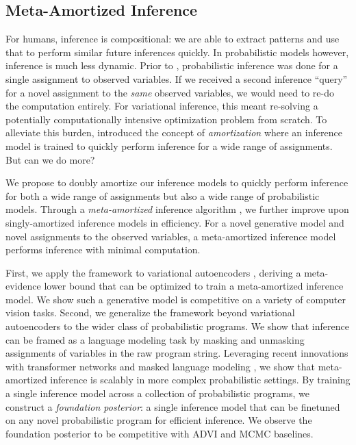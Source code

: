 \subsection{Meta-Amortized Inference}

For humans, inference is compositional: we are able to extract patterns and use that to perform similar future inferences quickly. In probabilistic models however, inference is much less dynamic. Prior to \cite{gershman2014amortized,kingma2013auto,rezende2014stochastic}, probabilistic inference was done for a single assignment to observed variables. If we received a second inference ``query'' for a novel assignment to the \textit{same} observed variables, we would need to re-do the computation entirely. For variational inference, this meant re-solving a potentially computationally intensive optimization problem from scratch. To alleviate this burden, \cite{gershman2014amortized} introduced the concept of \textit{amortization} where an inference model is trained to quickly perform inference for a wide range of assignments. But can we do more? 

We propose to doubly amortize our inference models to quickly perform inference for both a wide range of assignments but also a wide range of probabilistic models. Through a \textit{meta-amortized} inference algorithm \cite{wu2020meta}, we further improve upon singly-amortized inference models in efficiency. For a novel generative model and novel assignments to the observed variables, a meta-amortized inference model performs inference with minimal computation. 

First, we apply the framework to variational autoencoders \cite{wu2020meta}, deriving a meta- evidence lower bound that can be optimized to train a meta-amortized inference model. We show such a generative model is competitive on a variety of computer vision tasks. Second, we generalize the framework beyond variational autoencoders to the wider class of probabilistic programs. We show that inference can be framed as a language modeling task by masking and unmasking assignments of variables in the raw program string. Leveraging recent innovations with transformer networks \cite{vaswani2017attention} and masked language modeling \cite{devlin2018bert,liu2019roberta}, we show that meta-amortized inference is scalably in more complex probabilistic settings. By training a single inference model across a collection of probabilistic programs, we construct a \textit{foundation posterior}: a single inference model that can be finetuned on any novel probabilistic program for efficient inference. We observe the foundation posterior to be competitive with ADVI \cite{kucukelbir2015automatic,kucukelbir2016automatic,ranganath2014black} and MCMC \cite{murphy2022probabilistic,carpenter2017stan} baselines. 

